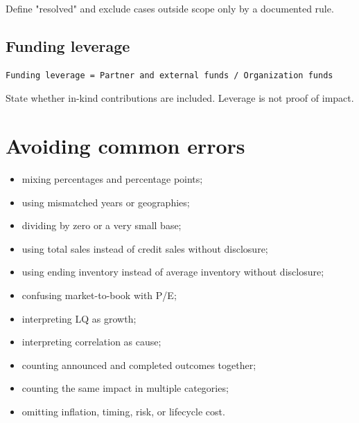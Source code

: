 \documentclass[11pt,letterpaper,oneside,openany]{book}
\begin{document}
Define "resolved" and exclude cases outside scope only by a documented rule.


\subsection[Funding leverage]{Funding leverage}
\begin{Verbatim}[fontsize=\small,breaklines=true,breakanywhere=true,frame=single,framesep=2mm]
Funding leverage = Partner and external funds / Organization funds
\end{Verbatim}

State whether in-kind contributions are included. Leverage is not proof of impact.


\section[Avoiding common errors]{Avoiding common errors}
\begin{itemize}
\item mixing percentages and percentage points;
\item using mismatched years or geographies;
\item dividing by zero or a very small base;
\item using total sales instead of credit sales without disclosure;
\item using ending inventory instead of average inventory without disclosure;
\item confusing market-to-book with P/E;
\item interpreting LQ as growth;
\item interpreting correlation as cause;
\item counting announced and completed outcomes together;
\item counting the same impact in multiple categories;
\item omitting inflation, timing, risk, or lifecycle cost.
\end{itemize}
\end{document}
